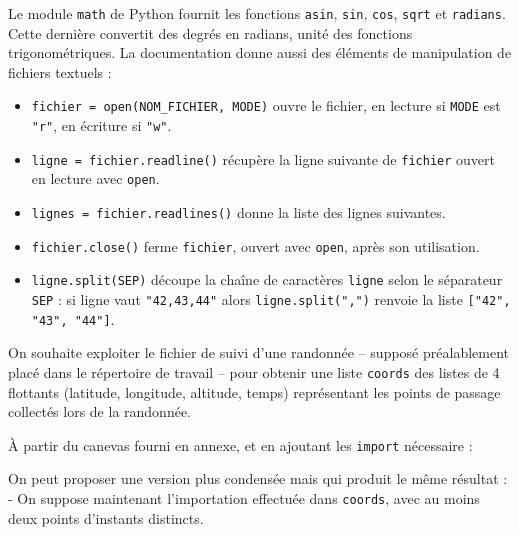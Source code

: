 \documentclass[11pt,a4paper]{article}
\begin{document}
\begin{Exercise}[title={Randonnée},origin={\bac \; d'après {\sc ccmp 2021 - pc, pc psi} (Partie 1)}]
Le module {\tt math} de Python fournit les fonctions {\tt asin}, {\tt sin}, {\tt cos}, {\tt sqrt} et {\tt radians}. Cette dernière convertit des degrés en radians, unité des fonctions trigonométriques. La documentation donne aussi des éléments de manipulation de fichiers textuels :
\begin{itemize}
	\item {\tt fichier = open(NOM\_FICHIER, MODE)} ouvre le fichier, en lecture si {\tt MODE} est {\tt "r"}, en écriture si {\tt "w"}.
	\item {\tt ligne = fichier.readline()} récupère la ligne suivante de {\tt fichier} ouvert en lecture avec {\tt open}.
	\item {\tt lignes = fichier.readlines()} donne la liste des lignes suivantes.
	\item {\tt fichier.close()} ferme {\tt fichier}, ouvert avec {\tt open}, après son utilisation.
	\item {\tt ligne.split(SEP)} découpe la chaîne de caractères {\tt ligne} selon le séparateur {\tt SEP} : si ligne vaut {\tt "42,43,44"} alors {\tt ligne.split(",")} renvoie la liste {\tt ["42", "43", "44"]}.
\end{itemize}
On souhaite exploiter le fichier de suivi d'une randonnée -- supposé préalablement placé dans le répertoire de travail -- pour obtenir une liste {\tt coords} des listes de 4 flottants (latitude, longitude, altitude, temps) représentant les points de passage collectés lors de la randonnée.

À partir du canevas fourni en annexe, et en ajoutant les {\tt import} nécessaire :

\leftskip 0pt

On peut proposer une version plus condensée mais qui produit le même résultat :
\leftskip -\QuestionIndent
On suppose maintenant l'importation effectuée dans {\tt coords}, avec au moins deux points d'instants distincts.
\leftskip 0pt



\end{Exercise}
\end{document}
